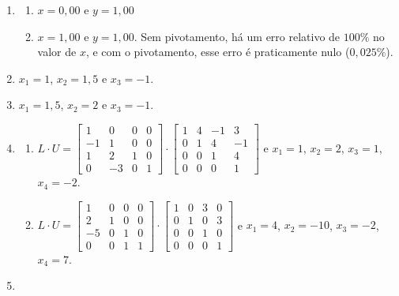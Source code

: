\documentclass[12pt,a4paper]{article}
\begin{document}
\begin{enumerate}
\item \begin{enumerate}
\item $x = 0,00$ e $y = 1,00$
\item $x = 1,00$ e $y = 1,00$. Sem pivotamento, há um erro relativo de $100\%$ no valor de $x$, e com o pivotamento, esse erro é praticamente nulo ($0,\!025\%$).
\end{enumerate}
\item $x_1 = 1$, $x_2 = 1,\!5$ e $x_3 = -1$.
\item $x_1 = 1,\!5$, $x_2 = 2$ e $x_3 = -1$.
\item \begin{enumerate}
\item $L \cdot U =
\begin{bmatrix}
 1 &  0 & 0 & 0 \\
-1 &  1 & 0 & 0 \\
 1 &  2 & 1 & 0 \\
 0 & -3 & 0 & 1
\end{bmatrix}
\cdot
\begin{bmatrix}
 1 & 4 & -1 &  3 \\
 0 & 1 &  4 & -1 \\
 0 & 0 &  1 &  4 \\
 0 & 0 &  0 &  1
\end{bmatrix}$ e $x_1 = 1$, $x_2 = 2$, $x_3 = 1$, $x_4 = -2$.
\item $L \cdot U =
\begin{bmatrix}
 1 &  0 & 0 & 0 \\
 2 &  1 & 0 & 0 \\
-5 &  0 & 1 & 0 \\
 0 &  0 & 1 & 1
\end{bmatrix}
\cdot
\begin{bmatrix}
 1 & 0 &  3 &  0 \\
 0 & 1 &  0 &  3 \\
 0 & 0 &  1 &  0 \\
 0 & 0 &  0 &  1
\end{bmatrix}$ e $x_1 = 4$, $x_2 = -10$, $x_3 = -2$, $x_4 = 7$.
\end{enumerate}
\item {}
\end{enumerate}
\end{document}
